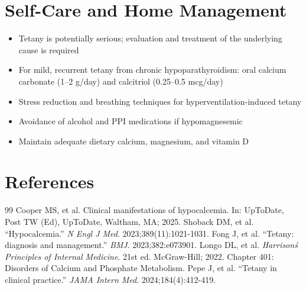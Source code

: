 \section*{Self-Care and Home Management}
\begin{itemize}
  \item Tetany is potentially serious; evaluation and treatment of the underlying cause is required
  \item For mild, recurrent tetany from chronic hypoparathyroidism: oral calcium carbonate (1--2 g/day) and calcitriol (0.25--0.5 mcg/day)
  \item Stress reduction and breathing techniques for hyperventilation-induced tetany
  \item Avoidance of alcohol and PPI medications if hypomagnesemic
  \item Maintain adequate dietary calcium, magnesium, and vitamin D
\end{itemize}

\section*{References}
\begin{thebibliography}{99}
 Cooper MS, et al. Clinical manifestations of hypocalcemia. In: UpToDate, Post TW (Ed), UpToDate, Waltham, MA; 2025.
 Shoback DM, et al. ``Hypocalcemia.'' \emph{N Engl J Med}. 2023;389(11):1021-1031.
 Fong J, et al. ``Tetany: diagnosis and management.'' \emph{BMJ}. 2023;382:e073901.
 Longo DL, et al. \emph{Harrison\'s Principles of Internal Medicine}. 21st ed. McGraw-Hill; 2022. Chapter 401: Disorders of Calcium and Phosphate Metabolism.
 Pepe J, et al. ``Tetany in clinical practice.'' \emph{JAMA Intern Med}. 2024;184(4):412-419.
\end{thebibliography}
